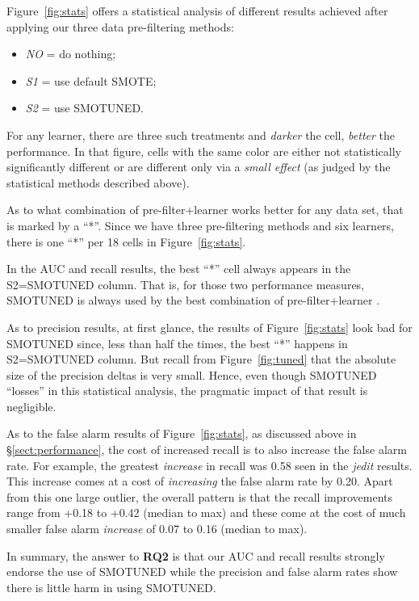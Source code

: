 \documentclass[10pt,conference]{IEEEtran}
\newcommand{\bi}{\begin{itemize}[leftmargin=0.4cm]}
\newcommand{\ei}{\end{itemize}}
\theoremstyle{break}
\theoremstyle{break}
\newcommand{\tion}[1]{{\S}\ref{sect:#1}}
\begin{document}
Figure~\ref{fig:stats} offers a statistical analysis
of different results achieved
after applying our three data pre-filtering methods:
\bi
\item  {\em NO} = do nothing;
\item {\em S1} = use default SMOTE;
\item {\em S2} = use SMOTUNED.
\ei
For any learner, there are three such treatments and {\em darker} the cell, {\em better} the performance. 
In that figure, cells with the same color are
either not statistically significantly different or
are different only via a {\em small effect}
(as judged by the statistical methods described above).

As to what combination of pre-filter+learner works better for any data set, that is marked by a ``*''. Since we have three pre-filtering methods and six learners, there is one   ``*'' per 18 cells in Figure~\ref{fig:stats}.

In the  AUC and recall results,  the best ``*'' cell always appears in the S2=SMOTUNED column. 
That is, for those two performance measures,  SMOTUNED is always
used by the best combination of pre-filter+learner .

As to precision  results,  at first glance, the  results of Figure~\ref{fig:stats} look bad for SMOTUNED since, less than half the times, 
the best ``*''  happens  in S2=SMOTUNED column.
 But recall from Figure~\ref{fig:tuned} that the absolute size of the precision deltas is very small.  Hence, even though SMOTUNED ``losses'' in this statistical analysis, the pragmatic impact of that result  is  negligible.
 
As to the false alarm results of Figure~\ref{fig:stats}, as discussed above in \tion{performance}, the cost of increased recall is to also increase
the false alarm rate. For example, the greatest \textit{increase} in recall was 0.58 seen in the {\em jedit} results. This increase comes at a cost
of \textit{increasing} the false alarm rate by 0.20. Apart from this one large outlier, the overall pattern is that the recall improvements range from +0.18 to +0.42 (median to max)
and these come at the cost of much smaller false alarm \textit{increase} of 0.07 to 0.16 (median to max). 
 
In summary, the answer to {\bf RQ2} is that our  AUC and recall results strongly endorse the  use of SMOTUNED
while the precision and false alarm rates
show there is little harm in using SMOTUNED.
\end{document}
